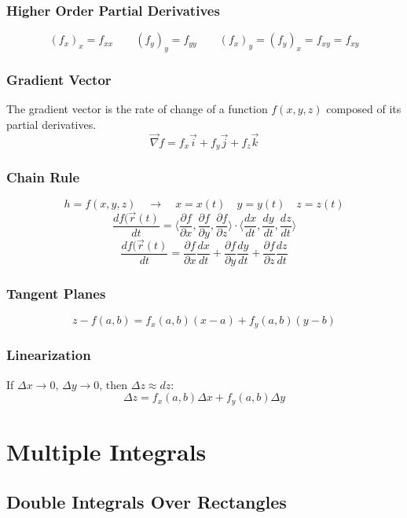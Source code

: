 \documentclass[11pt]{article}
\begin{document}
\subsubsection{Higher Order Partial Derivatives}
$$(f_{x})_x = f_{xx} \quad \quad (f_{y})_y = f_{yy} \quad \quad (f_{x})_y = (f_{y})_x  = f_{xy} = f_{xy}$$
\subsubsection{Gradient Vector}
The gradient vector is the rate of change of a function $f(x,y,z)$ composed of its partial derivatives.
$$ \vec{\nabla}f = f_x\vec{i} + f_y\vec{j} + f_z\vec{k} $$
\subsubsection{Chain Rule}
$$ h = f(x,y,z) \quad \rightarrow \quad x=x(t) \quad y = y(t) \quad z = z(t)$$
$$ \frac{df(\vec{r}(t)}{dt} = \langle\frac{\partial f}{\partial x}, \frac{\partial f}{\partial y}, \frac{\partial f}{\partial z}\rangle \cdot \langle\frac{dx}{dt}, \frac{dy}{dt}, \frac{dz}{dt}\rangle
$$
$$ \frac{df(\vec{r}(t)}{dt} = \frac{\partial f}{\partial x}\frac{dx}{dt} + \frac{\partial f}{\partial y} \frac{dy}{dt} + \frac{\partial f}{\partial z}\frac{dz}{dt}
$$

\subsubsection{Tangent Planes}
$$ z - f(a,b) = f_x(a,b)(x-a) + f_y(a,b)(y-b)$$

\subsubsection{Linearization}
If $\Delta x  \rightarrow 0 \text{, } \Delta y \rightarrow 0 \text{, then } \Delta z \approx dz:$
$$ \Delta z = f_x(a,b)\Delta x + f_y(a,b)\Delta y$$

\pagebreak

\section{Multiple Integrals}

\subsection{Double Integrals Over Rectangles}
\end{document}
